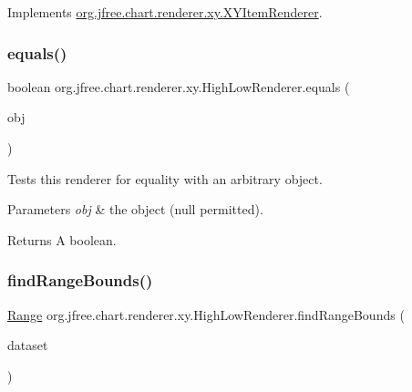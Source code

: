 Implements \mbox{\hyperlink{interfaceorg_1_1jfree_1_1chart_1_1renderer_1_1xy_1_1_x_y_item_renderer_ad867040a3ea09f5127596aacdd94586a}{org.\+jfree.\+chart.\+renderer.\+xy.\+X\+Y\+Item\+Renderer}}.

\mbox{\label{classorg_1_1jfree_1_1chart_1_1renderer_1_1xy_1_1_high_low_renderer_abf808deb2359dd0decc628950654b453}} 
\subsubsection{\texorpdfstring{equals()}{equals()}}
{\footnotesize\ttfamily boolean org.\+jfree.\+chart.\+renderer.\+xy.\+High\+Low\+Renderer.\+equals (\begin{DoxyParamCaption}\item[{Object}]{obj }\end{DoxyParamCaption})}

Tests this renderer for equality with an arbitrary object.


\begin{DoxyParams}{Parameters}
{\em obj} & the object ({\ttfamily null} permitted).\\
\hline
\end{DoxyParams}
\begin{DoxyReturn}{Returns}
A boolean. 
\end{DoxyReturn}
\mbox{\label{classorg_1_1jfree_1_1chart_1_1renderer_1_1xy_1_1_high_low_renderer_acb74a93988ad6f6eeeb87ed2610b0032}} 
\subsubsection{\texorpdfstring{find\+Range\+Bounds()}{findRangeBounds()}}
{\footnotesize\ttfamily \mbox{\hyperlink{classorg_1_1jfree_1_1data_1_1_range}{Range}} org.\+jfree.\+chart.\+renderer.\+xy.\+High\+Low\+Renderer.\+find\+Range\+Bounds (\begin{DoxyParamCaption}\item[{\mbox{\hyperlink{interfaceorg_1_1jfree_1_1data_1_1xy_1_1_x_y_dataset}{X\+Y\+Dataset}}}]{dataset }\end{DoxyParamCaption})}

